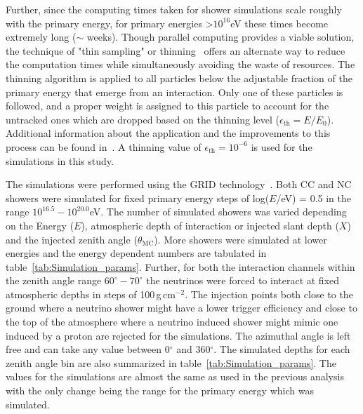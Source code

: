Further, since the computing times taken for shower simulations scale roughly with the primary energy, for primary energies >$10^{16}$eV these times become extremely long ($\sim$ weeks). Though parallel computing provides a viable solution, the technique of "thin sampling" or thinning~\cite{Hillas:1997tf} offers an alternate way to reduce the computation times while simultaneously avoiding the waste of resources. The thinning algorithm is applied to all particles below the adjustable fraction of the primary energy that emerge from an interaction. Only one of these particles is followed, and a proper weight is assigned to this particle to account for the untracked ones which are dropped based on the thinning level ($\epsilon_{\text{th}} = E/E_0$). Additional information about the application and the improvements to this process can be found in~\cite{Heck:1998gr,Kobal:2001jx}. A thinning value of $\epsilon_{\text{th}} = 10^{-6}$ is used for the simulations in this study.


The simulations were performed using the GRID technology~\cite{GRID_tech,LozanoBahilo:2012pe}. Both CC and NC showers were simulated for fixed primary energy steps of log($E$/eV) = 0.5 in the range $10^{16.5}-10^{20.0}$eV. The number of simulated showers was varied depending on the Energy ($E$), atmospheric depth of interaction or injected slant depth ($X$) and the injected zenith angle ($\theta_{\text{MC}}$). More showers were simulated at lower energies and the energy dependent numbers are tabulated in table~\ref{tab:Simulation_params}. Further, for both the interaction channels within the zenith angle range $60^{\circ}-70^{\circ}$ the neutrinos were forced to interact at fixed atmospheric depths in steps of 100\,g\,cm$^{-2}$. The injection points both close to the ground where a neutrino shower might have a lower trigger efficiency and close to the top of the atmosphere where a neutrino induced shower might mimic one induced by a proton are rejected for the simulations. The azimuthal angle is left free and can take any value between 0$^{\circ}$ and 360$^{\circ}$. The simulated depths for each zenith angle bin are also summarized in table~\ref{tab:Simulation_params}. The values for the simulations are almost the same as used in the previous analysis~\cite{gap_note_2013} with the only change being the range for the primary energy which was simulated.

